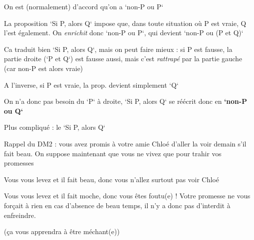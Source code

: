 \begin{frame}
	
On est (normalement) d'accord qu'on a `non-P ou P`\pause \newline

La proposition `Si P, alors Q` impose que, dans toute situation où P est vraie, Q l'est également. \pause On \textit{enrichit} donc `non-P ou P`, qui devient `non-P ou (P et Q)`\pause \newline 
	
Ca traduit bien `Si P, alors Q`, mais on peut faire mieux \pause : si P est fausse, la partie droite (`P et Q`) est fausse aussi, mais c'est \textit{rattrapé} par la partie gauche (car non-P est alors vraie)\pause  \newline
 	
A l'inverse, si P est vraie, la prop. devient simplement `Q`\pause \newline
 	
On n'a donc pas besoin du `P` à droite, `Si P, alors Q` se réécrit donc en \textbf{`non-P ou Q`}
\end{frame}


\begin{frame}
	
Plus compliqué : le `Si P, alors Q`\newline
	
Rappel du DM2 : vous avez promis à votre amie Chloé d'aller la voir demain s'il fait beau. \pause On suppose maintenant que vous ne vivez que pour trahir vos promesses\pause \newline

Vous vous levez et il fait beau, donc vous \pause n'allez surtout pas voir Chloé\pause \newline

Vous vous levez et il fait moche, donc vous \pause êtes foutu(e) ! \pause Votre promesse ne vous forçait à rien en cas d'absence de beau temps, il n'y a donc pas d'interdit à enfreindre. \pause\newline 

(ça vous apprendra à être méchant(e))

\end{frame}



